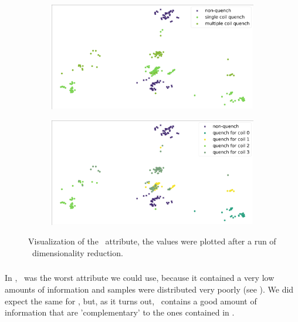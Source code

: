 \begin{figure}[!ht]
	\centering
	\begin{subfigure}{0.8\linewidth}
		\centering
		\includegraphics[width=\linewidth]{img/quench_dist_qlp/single_vs_multiple_An.png}
		\subcaption{}
	\end{subfigure}
	\begin{subfigure}{0.8\linewidth}
		\centering
		\includegraphics[width=\linewidth]{img/quench_dist_qlp_an.png}
		\subcaption{}
	\end{subfigure}
	\caption{Visualization of the \an\ attribute, the values were plotted after a run of \pca\
		dimensionality reduction.}\label{fig:an-coilq-dist}
\end{figure}

\subsubsection{\bn}
In \qrp, \bn\ was the worst attribute we could use, because it contained a very low amounts of
information and samples were distributed very poorly (see \Cref{fig:bn-dist}). We did expect the
same for \qlp, but, as it turns out, \bn\ contains a good amount of information that are
'complementary' to the ones contained in \an.

